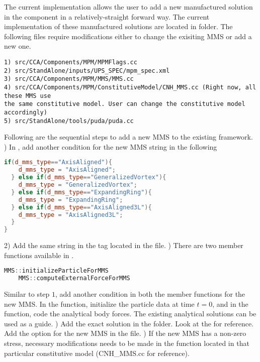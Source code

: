 The current implementation allows the user to add a new manufactured solution in the  component in a relatively-straight forward way. The current implementation of these manufactured solutions are located in  folder.
The following files require modifications either to change the exisiting MMS or add a new one.
\begin{lstlisting}[backgroundcolor=\color{background}]
1) src/CCA/Components/MPM/MPMFlags.cc
2) src/StandAlone/inputs/UPS_SPEC/mpm_spec.xml
3) src/CCA/Components/MPM/MMS/MMS.cc
4) src/CCA/Components/MPM/ConstitutiveModel/CNH_MMS.cc (Right now, all these MMS use
the same constitutive model. User can change the constitutive model accordingly)
5) src/StandAlone/tools/puda/puda.cc
\end{lstlisting}
Following are the sequential steps to add a new MMS to the existing framework. 
) In , add another  condition for the new MMS string in the following 
\begin{lstlisting}[language=Cpp]
if(d_mms_type=="AxisAligned"){
    d_mms_type = "AxisAligned";
  } else if(d_mms_type=="GeneralizedVortex"){
    d_mms_type = "GeneralizedVortex";
  } else if(d_mms_type=="ExpandingRing"){
    d_mms_type = "ExpandingRing";
  } else if(d_mms_type=="AxisAligned3L"){
    d_mms_type = "AxisAligned3L";
  }
}
\end{lstlisting}
2) Add the same string in the  tag located in the  file.
) There are two member functions available in .
\begin{lstlisting}[language=Cpp]
    MMS::initializeParticleForMMS
    MMS::computeExternalForceForMMS
\end{lstlisting}
Similar to step $1$, add another  condition in both the member functions for the new MMS. In the  function, initialize the particle data at time $t=0$, and in the  function, code the analytical body forces. The existing analytical solutions can be used as a guide.
) Add the exact solution in the  folder. Look at the  for reference. Add the option for the new MMS in the  file.
) If the new MMS has a non-zero stress, necessary modifications needs to be made in the  function located in that particular constitutive model (CNH\_MMS.cc for reference).


